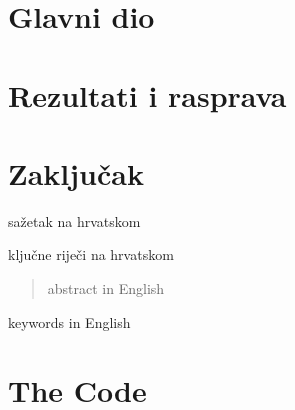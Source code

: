 \documentclass[zavrsnirad]{fer}
\begin{document}
	
	
	\chapter{Glavni dio}
	\label{pog:glavni_dio}
	
	\Blindtext
	
	
	\chapter{Rezultati i rasprava}
	\label{pog:rezultati_i_rasprava}
	
	\Blindtext
	
	
	\chapter{Zaključak}
	\label{pog:zakljucak}
	
	\blindtext
	
	
	
	
		\begin{sazetak}
		sažetak na hrvatskom
	\end{sazetak}
	
	\begin{kljucnerijeci}
		ključne riječi na hrvatskom
	\end{kljucnerijeci}    
	
	\begin{abstract}
		abstract in English
	\end{abstract}
	
	\begin{keywords}
		keywords in English
	\end{keywords}
	
	\backmatter
	
	\chapter{The Code}
	
	\Blindtext
	
\end{document}
